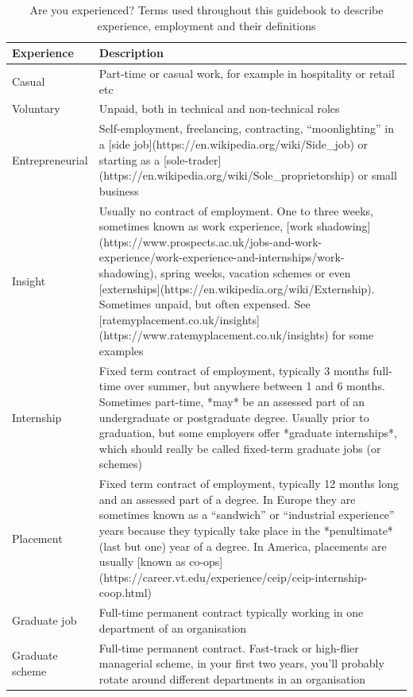 \documentclass[
]{book}
\begin{document}
\begin{table}

\caption{\label{tab:jobterms}Are you experienced? Terms used throughout this guidebook to describe experience, employment and their definitions}
\centering
\begin{tabular}[t]{ll}
\toprule
Experience & Description\\
\midrule
Casual & Part-time or casual work, for example in hospitality or retail etc\\
Voluntary & Unpaid, both in technical and non-technical roles\\
Entrepreneurial & Self-employment, freelancing, contracting, “moonlighting” in a [side job](https://en.wikipedia.org/wiki/Side\_job) or starting as a [sole-trader](https://en.wikipedia.org/wiki/Sole\_proprietorship) or small business\\
Insight & Usually no contract of employment. One to three weeks, sometimes known as work experience, [work shadowing](https://www.prospects.ac.uk/jobs-and-work-experience/work-experience-and-internships/work-shadowing), spring weeks, vacation schemes or even [externships](https://en.wikipedia.org/wiki/Externship). Sometimes unpaid, but often expensed. See [ratemyplacement.co.uk/insights](https://www.ratemyplacement.co.uk/insights) for some examples\\
Internship & Fixed term contract of employment, typically 3 months full-time over summer, but anywhere between 1 and 6 months. Sometimes part-time, *may* be an assessed part of an undergraduate or postgraduate degree. Usually prior to graduation, but some employers offer *graduate internships*, which should really be called fixed-term graduate jobs (or schemes)\\
\addlinespace
Placement & Fixed term contract of employment, typically 12 months long and an assessed part of a degree. In Europe they are sometimes known as a “sandwich” or “industrial experience” years because they typically take place in the *penultimate* (last but one) year of a degree. In America, placements are usually [known as co-ops](https://career.vt.edu/experience/ceip/ceip-internship-coop.html)\\
Graduate job & Full-time permanent contract typically working in one department of an organisation\\
Graduate scheme & Full-time permanent contract. Fast-track or high-flier managerial scheme, in your first two years, you'll probably rotate around different departments in an organisation\\
\bottomrule
\end{tabular}
\end{table}
\end{document}
